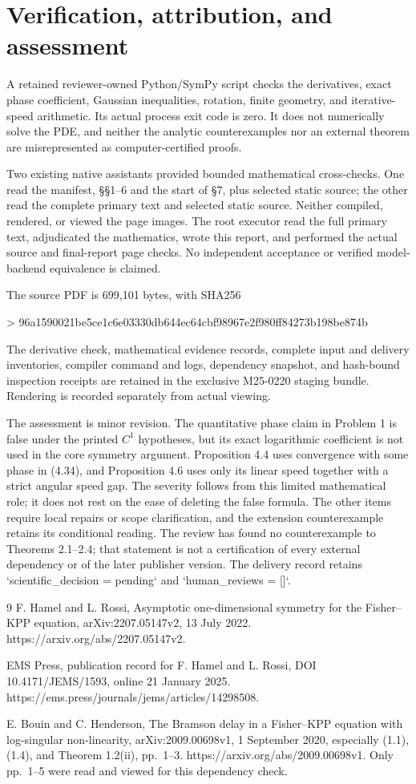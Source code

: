 \documentclass[10pt]{article}
\begin{document}
\section*{Verification, attribution, and assessment}
A retained reviewer-owned Python/SymPy script checks the derivatives, exact phase coefficient, Gaussian inequalities, rotation, finite geometry, and iterative-speed arithmetic. Its actual process exit code is zero. It does not numerically solve the PDE, and neither the analytic counterexamples nor an external theorem are misrepresented as computer-certified proofs.\par
Two existing native assistants provided bounded mathematical cross-checks. One read the manifest, §§1–6 and the start of §7, plus selected static source; the other read the complete primary text and selected static source. Neither compiled, rendered, or viewed the page images. The root executor read the full primary text, adjudicated the mathematics, wrote this report, and performed the actual source and final-report page checks. No independent acceptance or verified model-backend equivalence is claimed.\par
The source PDF is 699,101 bytes, with SHA256\par
> 96a1590021be5ce1c6e03330db644ec64cbf98967e2f980ff84273b198be874b\par
The derivative check, mathematical evidence records, complete input and delivery inventories, compiler command and logs, dependency snapshot, and hash-bound inspection receipts are retained in the exclusive M25-0220 staging bundle. Rendering is recorded separately from actual viewing.\par
The assessment is minor revision. The quantitative phase claim in Problem 1 is false under the printed \(C^1\) hypotheses, but its exact logarithmic coefficient is not used in the core symmetry argument. Proposition 4.4 uses convergence with some phase in (4.34), and Proposition 4.6 uses only its linear speed together with a strict angular speed gap. The severity follows from this limited mathematical role; it does not rest on the ease of deleting the false formula. The other items require local repairs or scope clarification, and the extension counterexample retains its conditional reading. The review has found no counterexample to Theorems 2.1–2.4; that statement is not a certification of every external dependency or of the later publisher version. The delivery record retains `scientific\_decision = pending` and `human\_reviews = []`.\par
9 F. Hamel and L. Rossi, Asymptotic one-dimensional symmetry for the Fisher–KPP equation, arXiv:2207.05147v2, 13 July 2022. https://arxiv.org/abs/2207.05147v2.\par
EMS Press, publication record for F. Hamel and L. Rossi, DOI 10.4171/JEMS/1593, online 21 January 2025. https://ems.press/journals/jems/articles/14298508.\par
E. Bouin and C. Henderson, The Bramson delay in a Fisher–KPP equation with log-singular non-linearity, arXiv:2009.00698v1, 1 September 2020, especially (1.1), (1.4), and Theorem 1.2(ii), pp. 1–3. https://arxiv.org/abs/2009.00698v1. Only pp. 1–5 were read and viewed for this dependency check.\par
\end{document}
